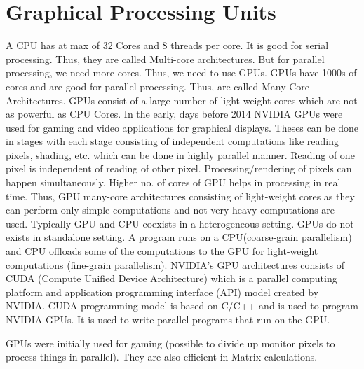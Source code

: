 \documentclass[12pt]{article}
\begin{document}
\newpage

\section{Graphical Processing Units}
A CPU has at max of 32 Cores and 8 threads per core. It is good for serial processing. Thus, they are called Multi-core architectures.
But for parallel processing, we need more cores. Thus, we need to use GPUs. GPUs have 1000s of cores and are good for parallel processing. Thus, are called Many-Core Architectures.
GPUs consist of a large number of light-weight cores which are not as powerful as CPU Cores. In the early, days before 2014 NVIDIA GPUs were used for gaming and video applications for graphical 
displays. Theses can be done in stages with each stage consisting of independent computations like reading pixels, shading, etc. which can be done in highly parallel manner. Reading of one pixel is 
independent of reading of other pixel. Processing/rendering of pixels can happen simultaneously. Higher no. of cores of GPU helps in processing in real time. Thus,
GPU many-core architectures consisting of light-weight cores as they can perform only simple computations and not very heavy computations are used.
Typically GPU and CPU coexists in a heterogeneous setting. GPUs do not exists in standalone setting. 
A program runs on a CPU(coarse-grain parallelism) and CPU offloads some of the computations to the GPU for light-weight computations (fine-grain parallelism).
NVIDIA's GPU architectures consists of CUDA (Compute Unified Device Architecture) which is a parallel computing platform and application programming interface (API) model created by NVIDIA.
CUDA programming model is based on C/C++ and is used to program NVIDIA GPUs. It is used to write parallel programs that run on the GPU.

GPUs were initially used for gaming (possible to divide up monitor pixels to process 
things in parallel). They are also efficient in Matrix calculations.
\end{document}
